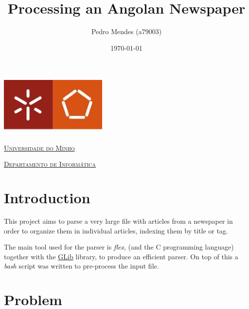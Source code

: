 \documentclass[a4paper]{article}
\begin{document}
\title{Processing an Angolan Newspaper}
\author{Pedro Mendes (a79003)}
\date{\today}

\begin{titlepage}
    \thispagestyle{empty}
    \begin{center}
        \begin{minipage}{0.75\linewidth}
            \centering
            \includegraphics[width=0.4\textwidth]{eng.jpeg}\par\vspace{1cm}
            \vspace{1.5cm}
            \href{https://www.uminho.pt/PT}
            {\scshape\LARGE Universidade do Minho} \par
            \vspace{1cm}
            \href{https://www.di.uminho.pt/}
            {\scshape\Large Departamento de Informática} \par
            \vspace{1.5cm}
            \maketitle
        \end{minipage}
    \end{center}

\end{titlepage}

\tableofcontents

\pagebreak

\section{Introduction}
This project aims to parse a very large file with articles from a newspaper in
order to organize them in individual articles, indexing them by title or tag.

The main tool used for the parser is \textit{flex}, (and the C programming
language) together with the \href{https://developer.gnome.org/}{GLib} library,
to produce an efficient parser. On top of this a \textit{bash} script was
written to pre-process the input file.

\section{Problem}
\end{document}
